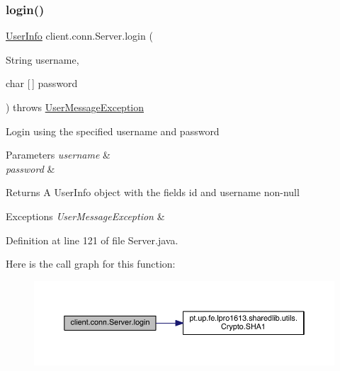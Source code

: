 \subsubsection{\texorpdfstring{login()}{login()}}
{\footnotesize\ttfamily \hyperlink{classpt_1_1up_1_1fe_1_1lpro1613_1_1sharedlib_1_1structs_1_1_user_info}{User\+Info} client.\+conn.\+Server.\+login (\begin{DoxyParamCaption}\item[{String}]{username,  }\item[{char \mbox{[}$\,$\mbox{]}}]{password }\end{DoxyParamCaption}) throws \hyperlink{classpt_1_1up_1_1fe_1_1lpro1613_1_1sharedlib_1_1exceptions_1_1_user_message_exception}{User\+Message\+Exception}}

Login using the specified username and password 
\begin{DoxyParams}{Parameters}
{\em username} & \\
\hline
{\em password} & \\
\hline
\end{DoxyParams}
\begin{DoxyReturn}{Returns}
A {\ttfamily User\+Info} object with the fields {\ttfamily id} and {\ttfamily username} non-\/null 
\end{DoxyReturn}

\begin{DoxyExceptions}{Exceptions}
{\em User\+Message\+Exception} & \\
\hline
\end{DoxyExceptions}


Definition at line 121 of file Server.\+java.

Here is the call graph for this function\+:
\nopagebreak
\begin{figure}[H]
\begin{center}
\leavevmode
\includegraphics[width=350pt]{classclient_1_1conn_1_1_server_a064556a987ee40eb0a91a952ae08969f_cgraph}
\end{center}
\end{figure}
\hypertarget{classclient_1_1conn_1_1_server_af45689754d02a83d53602d01a9bf2427}{}\label{classclient_1_1conn_1_1_server_af45689754d02a83d53602d01a9bf2427} 

